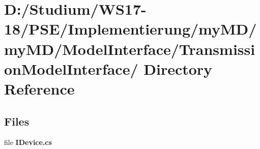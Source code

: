 \hypertarget{dir_D_3A_2FStudium_2FWS17_2D18_2FPSE_2FImplementierung_2FmyMD_2FmyMD_2FModelInterface_2FTransmissionModelInterface_2F}{
\section{D:/Studium/WS17-18/PSE/Implementierung/my\-MD/my\-MD/Model\-Interface/Transmission\-Model\-Interface/ Directory Reference}
\label{dir_D_3A_2FStudium_2FWS17_2D18_2FPSE_2FImplementierung_2FmyMD_2FmyMD_2FModelInterface_2FTransmissionModelInterface_2F}
}


\subsection*{Files}
\begin{CompactItemize}
\item 
file {\bf IDevice.cs}
\end{CompactItemize}
